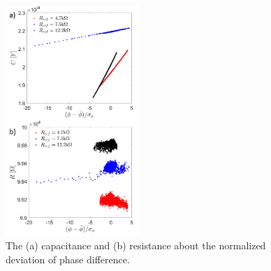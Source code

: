 \documentclass[%
 aip,
 amsmath,amssymb,
 reprint,%
]{revtex4-1}
\begin{document}
\begin{figure}[!h]
    \centering
    \includegraphics[width=0.45\textwidth]{./figures/stdphiandRC.png}
    \caption{The (a) capacitance and (b) resistance about the normalized deviation of phase difference. }
    \label{fig:stdphiandRC}
\end{figure}
\end{document}
